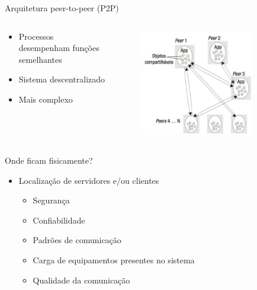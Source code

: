 \documentclass[aspectratio=169,
				xcolor=table]{beamer}
\begin{document}
	\begin{frame}{Arquitetura peer-to-peer (P2P)}
		\begin{columns}
			\begin{column}{0.5\textwidth}
				\begin{itemize}
					\item Processos desempenham funções semelhantes
					\vspace{1em}
					\item Sistema descentralizado
					\vspace{1em}
					\item Mais complexo
				\end{itemize}
			\end{column}
			\begin{column}{0.5\textwidth}
				\begin{figure}[hbtp]
				\centering
				\includegraphics[width=0.8\textwidth, keepaspectratio]{../figs/cap02/p2p.png}
				\end{figure}	
			\end{column}
		\end{columns}
	\end{frame}
	
	\begin{frame}{Onde ficam fisicamente?}
		\begin{itemize}
			\item Localização de servidores e/ou clientes
			\begin{itemize}
				\item Segurança
				\item Confiabilidade
				\item Padrões de comunicação
				\item Carga de equipamentos presentes no sistema
				\item Qualidade da comunicação
			\end{itemize}
		\end{itemize}
	\end{frame}
	
\end{document}
